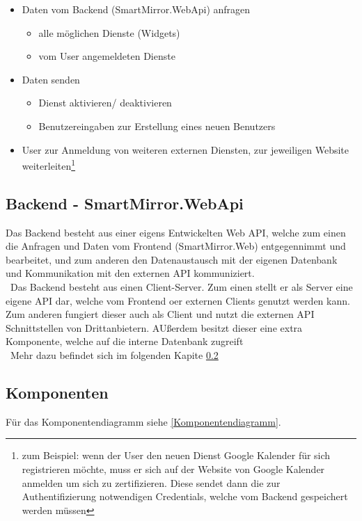 \begin{itemize}
\item Daten vom Backend (SmartMirror.WebApi) anfragen
\begin{itemize}
\item alle möglichen Dienste (Widgets)
\item vom User angemeldeten Dienste
\end{itemize}
\item Daten senden
\begin{itemize}
\item Dienst aktivieren/ deaktivieren
\item Benutzereingaben zur Erstellung eines neuen Benutzers
\end{itemize}
\item User zur Anmeldung von weiteren externen Diensten, zur jeweiligen Website weiterleiten\footnote{zum Beispiel: wenn der User den neuen Dienst Google Kalender für sich registrieren möchte, muss er sich auf der Website von Google Kalender anmelden um sich zu zertifizieren. Diese sendet dann die zur Authentifizierung notwendigen Credentials, welche vom Backend gespeichert werden müssen }
\end{itemize} 

\subsection{Backend - SmartMirror.WebApi}
Das Backend besteht aus einer eigens Entwickelten Web API, welche zum einen die Anfragen und Daten vom Frontend (SmartMirror.Web) entgegennimmt und bearbeitet, und zum anderen den Datenaustausch mit der eigenen Datenbank und Kommunikation mit den externen API kommuniziert.\\\
Das Backend besteht aus einen Client-Server. Zum einen stellt er als Server eine eigene API dar, welche vom Frontend oer externen Clients genutzt werden kann. Zum anderen fungiert dieser auch als Client und nutzt die externen API Schnittstellen von Drittanbietern. AUßerdem besitzt dieser eine extra Komponente, welche auf die interne Datenbank zugreift\\\
Mehr dazu befindet sich im folgenden Kapite \ref{Komponenten}



\subsection{Komponenten}\label{Komponenten}
Für das Komponentendiagramm siehe \ref{Komponentendiagramm}.
